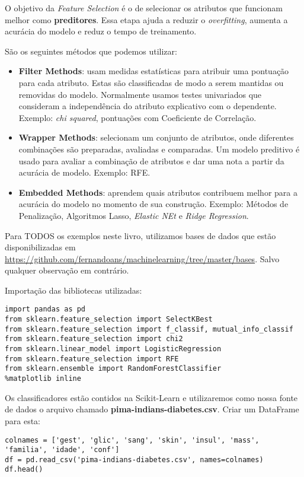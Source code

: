 O objetivo da \textit{Feature Selection} é o de selecionar os atributos que funcionam melhor como \textbf{preditores}. Essa etapa ajuda a reduzir o \textit{overfitting}, aumenta a acurácia do modelo e reduz o tempo de treinamento.

São os seguintes métodos que podemos utilizar: \vspace{-1em}
\begin{itemize}
	\item \textbf{Filter Methods}: usam medidas estatísticas para atribuir uma pontuação para cada atributo. Estas são classificadas de modo a serem mantidas ou removidas do modelo. Normalmente usamos testes univariados que consideram a independência do atributo explicativo com o dependente. Exemplo: \textit{chi squared}, pontuações com Coeficiente de Correlação.
	\item \textbf{Wrapper Methods}: selecionam um conjunto de atributos, onde diferentes combinações são preparadas, avaliadas e comparadas. Um modelo preditivo é usado para avaliar a combinação de atributos e dar uma nota a partir da acurácia de modelo. Exemplo: RFE.
	\item \textbf{Embedded Methods}: aprendem quais atributos contribuem melhor para a acurácia do modelo no momento de sua construção. Exemplo: Métodos de Penalização, Algoritmos Lasso, \textit{Elastic NEt} e \textit{Ridge Regression}.
\end{itemize}

\begin{note} 
	Para TODOS os exemplos neste livro, utilizamos bases de dados que estão disponibilizadas em \url{https://github.com/fernandoans/machinelearning/tree/master/bases}. Salvo qualquer observação em contrário.
\end{note}

Importação das bibliotecas utilizadas:
\begin{lstlisting}[]
import pandas as pd
from sklearn.feature_selection import SelectKBest
from sklearn.feature_selection import f_classif, mutual_info_classif
from sklearn.feature_selection import chi2
from sklearn.linear_model import LogisticRegression
from sklearn.feature_selection import RFE
from sklearn.ensemble import RandomForestClassifier
%matplotlib inline
\end{lstlisting}

Os classificadores estão contidos na Scikit-Learn e utilizaremos como nossa fonte de dados o arquivo chamado \textbf{pima-indians-diabetes.csv}. Criar um DataFrame para esta:
\begin{lstlisting}[]
colnames = ['gest', 'glic', 'sang', 'skin', 'insul', 'mass', 'familia', 'idade', 'conf']
df = pd.read_csv('pima-indians-diabetes.csv', names=colnames)
df.head()
\end{lstlisting}

